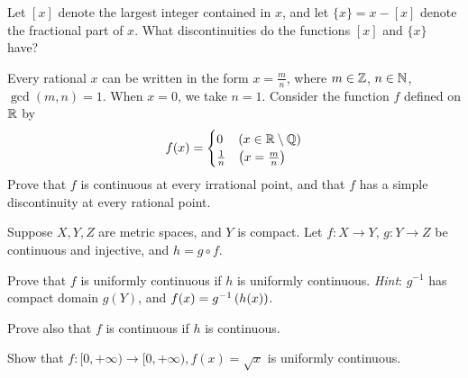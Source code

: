 \begin{exercise}
Let $[x]$ denote the largest integer contained in $x$, and let $\{x\}=x-[x]$ denote the fractional part of $x$. What discontinuities do the functions $[x]$ and $\{x\}$ have? 
\end{exercise}

\begin{exercise}
Every rational $x$ can be written in the form $x=\frac{m}{n}$, where $m\in\mathbb Z$, $n\in\mathbb N$, $\gcd(m,n)=1$. When $x=0$, we take $n=1$. Consider the function $f$ defined on $\mathbb R$ by
\[f(x)=\begin{cases}
0&(x\in\mathbb R\setminus\mathbb Q)\\
\frac{1}{n}&\left(x=\frac{m}{n}\right)
\end{cases}\]
Prove that $f$ is continuous at every irrational point, and that $f$ has a simple discontinuity at every rational point.
\end{exercise}

\begin{exercise}
Suppose $X, Y, Z$ are metric spaces, and $Y$ is compact. Let $f\colon X\to Y$, $g\colon Y\to Z$ be continuous and injective, and $h=g\circ f$.

Prove that $f$ is uniformly continuous if $h$ is uniformly continuous. \emph{Hint}: $g^{-1}$ has compact domain $g(Y)$, and $f(x)=g^{-1}\left(h(x)\right)$.

Prove also that $f$ is continuous if $h$ is continuous.
\end{exercise}

\begin{exercise}
Show that $f\colon[0,+\infty)\to[0,+\infty), f(x)=\sqrt{x}$ is uniformly continuous.
\end{exercise}